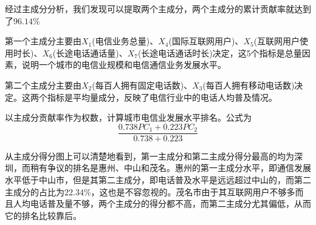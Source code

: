 \documentclass[UTF8,a4paper]{ctexart}
\begin{document}
    经过主成分分析，我们发现可以提取两个主成分，两个主成分的累计贡献率就达到了\(96.14\%\)

第一个主成分主要由\(X_1\)(电信业务总量)、\(X_4\)(国际互联网用户)、\(X_5\)(互联网用户使用时长)、\(X_6\)(长途电话通话量)、\(X_7\)(长途电话通话时长)决定，这5个指标是总量因素，说明一个城市的电信业规模和电信通信业务发展水平。

第二个主成分主要由\(X_2\)(每百人拥有固定电话数)、\(X_3\)(每百人拥有移动电话数)决定。这两个指标是平均量成分，反映了电信行业中的电话人均普及情况。

以主成分贡献率作为权数，计算城市电信业发展水平排名。公式为 \[
\frac{0.738PC_1 + 0.223PC_2}{0.738 + 0.223}
\]

从主成分得分图上可以清楚地看到，第一主成分和第二主成分得分最高的均为深圳，而稍有争议的排名是惠州、中山和茂名。惠州的第一主成分水平，即通信发展水平低于中山市，但是其第二主成分，即电话普及水平是远远超过中山的，而第二主成分的占比为\(22.34\%\)，这也是不容忽视的。茂名市由于其互联网用户不够多而且人均电话普及量不够，两个主成分的得分都不高，而第二主成分尤其偏低，从而它的排名比较靠后。


    
    
    
\end{document}
